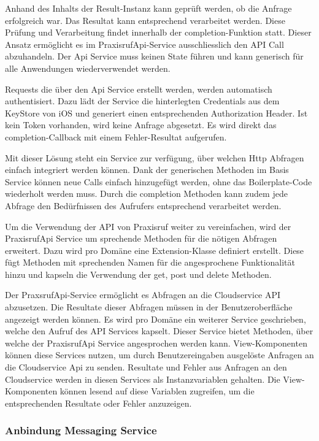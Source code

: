 Anhand des Inhalts der Result-Instanz kann geprüft werden, ob die Anfrage erfolgreich war.
Das Resultat kann entsprechend verarbeitet werden.
Diese Prüfung und Verarbeitung findet innerhalb der completion-Funktion statt.
Dieser Ansatz ermöglicht es im PraxisrufApi-Service ausschliesslich den API Call abzuhandeln.
Der Api Service muss keinen State führen und kann generisch für alle Anwendungen wiederverwendet werden.

Requests die über den Api Service erstellt werden, werden automatisch authentisiert.
Dazu lädt der Service die hinterlegten Credentials aus dem KeyStore von iOS und generiert einen entsprechenden Authorization Header.
Ist kein Token vorhanden, wird keine Anfrage abgesetzt.
Es wird direkt das completion-Callback mit einem Fehler-Resultat aufgerufen.

Mit dieser Lösung steht ein Service zur verfügung, über welchen Http Abfragen einfach integriert werden können.
Dank der generischen Methoden im Basis Service können neue Calls einfach hinzugefügt werden, ohne das Boilerplate-Code wiederholt werden muss.
Durch die completion Methoden kann zudem jede Abfrage den Bedürfnissen des Aufrufers entsprechend verarbeitet werden.

Um die Verwendung der API von Praxisruf weiter zu vereinfachen, wird der PraxisrufApi Service um sprechende Methoden für die nötigen Abfragen erweitert.
Dazu wird pro Domäne eine Extension-Klasse definiert erstellt.
Diese fügt Methoden mit sprechenden Namen für die angesprochene Funktionalität hinzu und kapseln die Verwendung der get, post und delete Methoden.

Der PraxsrufApi-Service ermöglicht es Abfragen an die Cloudservice API abzusetzen.
Die Resultate dieser Abfragen müssen in der Benutzeroberfläche angezeigt werden können.
Es wird pro Domäne ein weiterer Service geschrieben, welche den Aufruf des API Services kapselt.
Dieser Service bietet Methoden, über welche der PraxisrufApi Service angesprochen werden kann.
View-Komponenten können diese Services nutzen, um durch Benutzereingaben ausgelöste Anfragen an die Cloudservice Api zu senden.
Resultate und Fehler aus Anfragen an den Cloudservice werden in diesen Services als Instanzvariablen gehalten.
Die View-Komponenten können lesend auf diese Variablen zugreifen, um die entsprechenden Resultate oder Fehler anzuzeigen.

\subsubsection{Anbindung Messaging Service}

